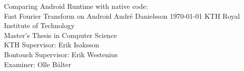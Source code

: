 \documentclass[12pt,a4paper,openright,parskip,final,twoside,en]{csee_msc_thesis} %
\begin{document}
\def\thesistitle{\Large Comparing Android Runtime with native code:\\ Fast Fourier Transform on Android}
\def\theauthor{\large André Danielsson}
\def\theaddress{KTH Royal Institute of Technology\\
    \vspace{3mm}
    Master's Thesis in Computer Science\\
    \vspace{3cm}
    KTH Supervisor: Erik Isaksson\\
    \vspace{5mm}
    Bontouch Supervisor: Erik Westenius\\
    \vspace{5mm}
    Examiner: Olle Bälter
}
\def\theabstract{}
\def\thedate{\today}
\def\thepreface{}
\def\thesweabstract{}

\startpreamble
  {\thesistitle}
  {\theauthor}
  {\thedate}
  {\theabstract}
  {\thepreface}
  {\theaddress}
  {\thesweabstract}













\appendix






\fancyhead[LO]{}%
\fancyhead[RE]{}%
\fancyhead[LE]{\thepage}%
\fancyhead[RO]{\thepage}


\end{document}
